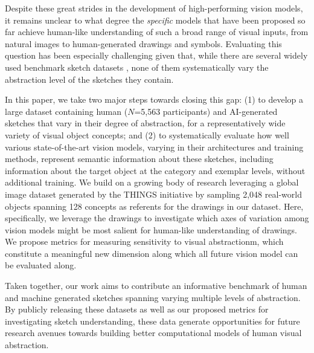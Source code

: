 \documentclass[10pt,letterpaper]{article}
\begin{document}
Despite these great strides in the development of high-performing vision models, it remains unclear to what degree the \textit{specific} models that have been proposed so far achieve human-like understanding of such a broad range of visual inputs, from natural images to human-generated drawings and symbols.
Evaluating this question has been especially challenging given that, while there are several widely used benchmark sketch datasets \cite{eitz2012sketch, jongejan2017quick, sangkloy2016sketchy}, none of them systematically vary the abstraction level of the sketches they contain. 

In this paper, we take two major steps towards closing this gap: 
(1) to develop a large dataset containing human ($N$=5,563 participants) and AI-generated sketches that vary in their degree of abstraction, for a representatively wide variety of visual object concepts; 
and (2) to systematically evaluate how well various state-of-the-art vision models, varying in their architectures and training methods, represent semantic information about these sketches, including information about the target object at the category and exemplar levels, without additional training. 
We build on a growing body of research leveraging a global image dataset generated by the THINGS initiative \cite{hebart2019things} by sampling 2,048 real-world objects spanning 128 concepts as referents for the drawings in our dataset.
Here, specifically, we leverage the drawings to investigate which axes of variation among vision models might be most salient for human-like understanding of drawings.
We propose metrics for measuring sensitivity to visual abstractionm, which constitute a meaningful new dimension along which all future vision model can be evaluated along.

Taken together, our work aims to contribute an informative benchmark of human and machine generated sketches spanning varying multiple levels of abstraction. 
By publicly releasing these datasets as well as our proposed metrics for investigating sketch understanding, these data generate opportunities for future research avenues towards building better computational models of human visual abstraction.
\end{document}
